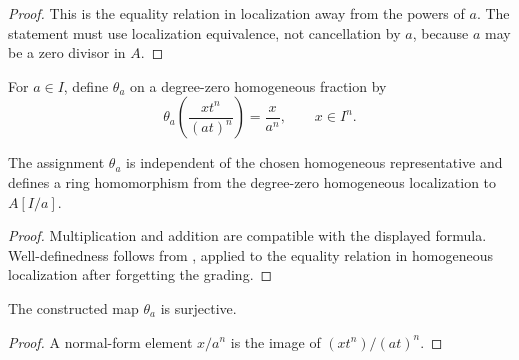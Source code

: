 \begin{proof}
  This is the equality relation in localization away from the powers of $a$.
  The statement must use localization equivalence, not cancellation by $a$,
  because $a$ may be a zero divisor in $A$.
\end{proof}

\begin{definition}
  \label{def:nagata-homogeneous-away-to-chart}

  For $a\in I$, define $\theta_a$ on a degree-zero homogeneous fraction by
  \[
    \theta_a\!\left(\frac{xt^n}{(at)^n}\right)=\frac{x}{a^n},
    \qquad x\in I^n.
  \]
\end{definition}

\begin{lemma}
  \label{lemma:nagata-homogeneous-away-to-chart}

  The assignment $\theta_a$ is independent of the chosen homogeneous
  representative and defines a ring homomorphism from the degree-zero
  homogeneous localization to $A[I/a]$.
\end{lemma}

\begin{proof}
  Multiplication and addition are compatible with the displayed formula.
  Well-definedness follows from
  , applied to the equality
  relation in homogeneous localization after forgetting the grading.
\end{proof}

\begin{lemma}
  \label{lemma:nagata-homogeneous-away-to-chart-surjective}

  The constructed map $\theta_a$ is surjective.
\end{lemma}

\begin{proof}
  A normal-form element $x/a^n$ is the image of
  $(xt^n)/(at)^n$.
\end{proof}

